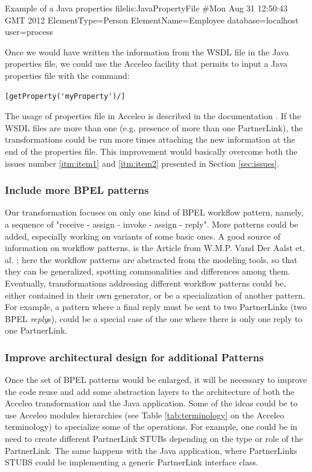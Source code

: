 \begin{center}
  \begin{minipage}{1\textwidth}
    \begin{java-code}{Example of a Java properties file}{lis:JavaPropertyFile}
#Mon Aug 31 12:50:43 GMT 2012
ElementType=Person
ElementName=Employee
database=localhost
user=process
    \end{java-code}
  \end{minipage}
\end{center}

Once we would have written the information from the WSDL file in the Java properties file, we could use the Acceleo facility that permits to input a Java properties file with the command:\\
\begin{verbatim}[getProperty('myProperty')/]\end{verbatim} 
The usage of properties file in Acceleo is described in the documentation \cite{acceleoDoc}. If the WSDL files are more than one (e.g. presence of more than one PartnerLink), the transformations could be run more times attaching the new information at the end of the properties file.
This improvement would basically overcome both the issues number \ref{itm:item1} and \ref{itm:item2} presented in Section \ref{sec:issues}.

\subsubsection{Include more BPEL patterns}
\label{sec:FutMorePatterns}
Our transformation focuses on only one kind of BPEL workflow pattern, namely, a sequence of "receive - assign - invoke - assign - reply". More patterns could be added, especially working on variants of some basic ones. A good source of information on workflow patterns, is the Article from W.M.P. Vand Der Aalst et. al. \cite{AalstHKB03}; here the workflow patterns are abstracted from the modeling tools, so that they can be generalized, spotting commonalities and differences among them.
Eventually, transformations addressing different workflow patterns could be, either contained in their own generator, or be a specialization of another pattern. For example, a pattern where a final reply must be sent to two PartnerLinks (two BPEL \textit{reply}s), could be a special case of the one where there is only one reply to one PartnerLink.    

\subsubsection{Improve architectural design for additional Patterns}
\label{sec:FutImproveArchitectDesign}
Once the set of BPEL patterns would be enlarged, it will be necessary to improve the code reuse and add some abstraction layers to the architecture of both the Acceleo transformation and the Java application. Some of the ideas could be to use Acceleo modules hierarchies (see Table \ref{tab:terminology} on the Acceleo terminology) to specialize some of the operations. For example, one could be in need to create different PartnerLink STUBs depending on the type or role of the PartnerLink. The same happens with the Java application, where PartnerLinks STUBS could be implementing a generic PartnerLink interface class. 
